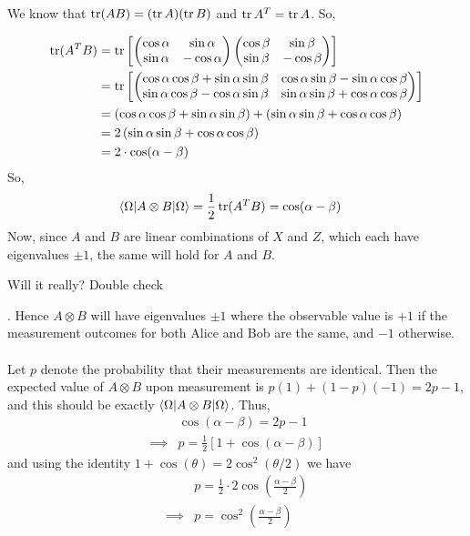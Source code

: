 \documentclass[11pt]{article}
\begin{document}
\begin{enumerate}[(a).]
  We know that $\mathrm{tr}(A B) = (\operatorname{tr} A) (\operatorname{tr} B) $ and $\operatorname{tr} A^T = \operatorname{tr} A$. So, 

  \begin{align*}
    \operatorname{tr}(A^T B) &= \operatorname{tr} \left[ \begin{pmatrix}
      \cos\alpha & \sin\alpha \\
      \sin\alpha & -\cos\alpha
    \end{pmatrix} \begin{pmatrix}
      \cos\beta & \sin\beta \\
      \sin\beta & -\cos\beta
    \end{pmatrix}  \right] \\
    &= \operatorname{tr} \left[ \begin{pmatrix}
      \cos\alpha \cos\beta + \sin\alpha \sin \beta & \cos\alpha \sin\beta - \sin\alpha \cos\beta \\
      \sin\alpha \cos\beta - \cos\alpha \sin \beta & \sin\alpha \sin\beta + \cos\alpha \cos\beta
    \end{pmatrix}  \right] \\
    &= \left(\cos\alpha\cos\beta + \sin\alpha\sin\beta\right) + \left( \sin\alpha \sin\beta + \cos\alpha \cos\beta \right) \\
    &= 2 \left( \sin\alpha \sin\beta + \cos\alpha \cos\beta \right) \\
    &= 2 \cdot \cos(\alpha - \beta)
  \end{align*} So, 
  \begin{align*}
    \langle \Omega | A \otimes B | \Omega \rangle &= \frac{1}{2} \operatorname{tr}(A^T B) = \cos(\alpha - \beta)
  \end{align*} Now, since $A$ and $B$ are linear combinations of $X$ and $Z$, which each have eigenvalues $\pm 1$, the same will hold for $A$ and $B$. \begin{note}
    {Will it really? Double check}
  \end{note}. Hence $A \otimes B$ will have eigenvalues $\pm 1$ where the observable value is $+1$ if the measurement outcomes for both Alice and Bob are the same, and $-1$ otherwise. 
  \\
  \\
  Let $p$ denote the probability that their measurements are identical. Then the expected value of $A \otimes B$ upon measurement is $p(1) + (1-p)(-1) = 2p-1$, and this should be exactly $\langle \Omega | A \otimes B | \Omega \rangle$. Thus,
  \begin{align*}
    &\cos(\alpha - \beta) = 2p - 1 \\
    \implies& p = \frac{1}{2} \left[ 1 + \cos(\alpha - \beta)  \right]
  \end{align*} and using the identity $1 + \cos(\theta) = 2\cos^2(\theta/2) $ we have 
  \begin{align*}
    &p = \frac{1}{2} \cdot 2 \cos\left( \frac{\alpha - \beta}{2} \right) \\
    \implies& \boxed{p = \cos^2\left(\frac{\alpha - \beta}{2}\right)}
  \end{align*} 


\end{enumerate}
\end{document}
